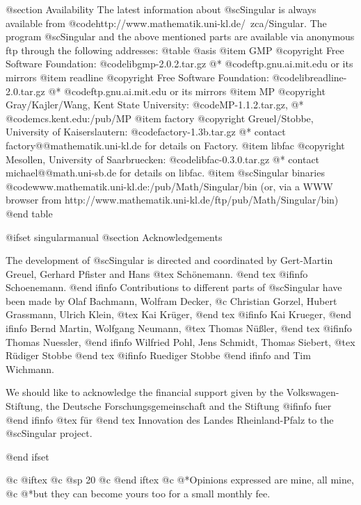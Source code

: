 @section Availability
The latest information about @sc{Singular} is always available from
@code{http://www.mathematik.uni-kl.de/~zca/Singular}.
The program @sc{Singular} and the above mentioned parts are available via
anonymous ftp through the following addresses:
@table @asis
@item GMP
@copyright{} Free Software Foundation:
@code{libgmp-2.0.2.tar.gz}
@* @code{ftp.gnu.ai.mit.edu} or its mirrors
@item readline
@copyright{} Free Software Foundation:
@code{libreadline-2.0.tar.gz}
@* @code{ftp.gnu.ai.mit.edu} or its mirrors
@item MP
@copyright{} Gray/Kajler/Wang, Kent State University:
@code{MP-1.1.2.tar.gz},
@* @code{mcs.kent.edu:/pub/MP}
@item factory
@copyright{} Greuel/Stobbe, University of Kaiserslautern:
@code{factory-1.3b.tar.gz}
@* contact factory@@mathematik.uni-kl.de for details on Factory.
@item libfac
@copyright{}  Mesollen, University  of Saarbruecken:
@code{libfac-0.3.0.tar.gz}
@* contact michael@@math.uni-sb.de for details on libfac.
@item @sc{Singular} binaries
@code{www.mathematik.uni-kl.de:/pub/Math/Singular/bin}
(or, via a WWW browser from http://www.mathematik.uni-kl.de/ftp/pub/Math/Singular/bin)
@end table

@ifset singularmanual
@section Acknowledgements

The development of @sc{Singular} is directed and coordinated by
Gert-Martin Greuel, Gerhard Pfister and Hans
@tex
 Sch\"onemann.
@end tex
@ifinfo
 Schoenemann.
@end ifinfo
Contributions to different parts of @sc{Singular} have been made by
Olaf Bachmann,
Wolfram Decker,
@c Christian Gorzel,
Hubert Grassmann,
Ulrich Klein,
@tex
Kai Kr\"uger,
@end tex
@ifinfo
Kai Krueger,
@end ifinfo
Bernd Martin,
Wolfgang Neumann,
@tex
Thomas N\"u{\ss}ler,
@end tex
@ifinfo
Thomas Nuessler,
@end ifinfo
Wilfried Pohl,
Jens Schmidt,
Thomas Siebert,
@tex
R\"udiger Stobbe
@end tex
@ifinfo
Ruediger Stobbe
@end ifinfo
and
Tim Wichmann.

We should like to acknowledge the financial support given by
the Volkswagen-Stiftung,
the Deutsche Forschungsgemeinschaft
and the Stiftung
@ifinfo
fuer
@end ifinfo
@tex
f\"ur
@end tex
 Innovation des Landes Rheinland-Pfalz
to the
@sc{Singular} project.

@end ifset

@c @iftex
@c @sp 20
@c @end iftex
@c @*Opinions expressed are mine,  all mine,
@c @*but they can become yours too for a small monthly fee.
